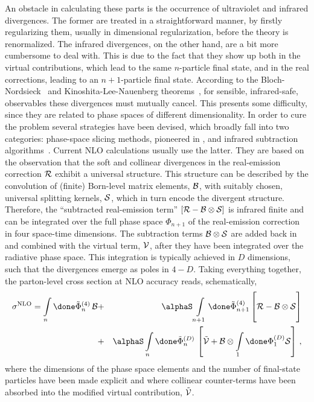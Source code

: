 An obstacle in calculating these parts is the occurrence of
ultraviolet and infrared divergences.  The former are treated in a
straightforward manner, by firstly regularizing them, usually in
dimensional regularization, before the theory is renormalized.  The
infrared divergences, on the other hand, are a bit more cumbersome to
deal with.  This is due to the fact that they show up both in the
virtual contributions, which lead to the same $n$-particle final
state, and in the real corrections, leading to an $n+1$-particle final
state.  According to the Bloch-Nordsieck~\cite{Bloch:1937pw} and
Kinoshita-Lee-Nauenberg theorems~\cite{Kinoshita:1962ur,Lee:1964is},
for sensible, \ie infrared-safe, observables these divergences must
mutually cancel.  This presents some difficulty, since they are
related to phase spaces of different dimensionality.  In order to cure
the problem several strategies have been devised, which broadly fall
into two categories: phase-space slicing methods, pioneered in
\cite{Giele:1991vf,Giele:1993dj}, and infrared subtraction
algorithms~\cite{Catani:1996vz,Catani:2002hc,
  Kosower:1997zr,Kosower:2003bh,GehrmannDeRidder:2005cm,Daleo:2006xa,
  Frixione:1995ms,Frixione:1997np}. Current NLO calculations usually
use the latter.  They are based on the observation that the soft and
collinear divergences in the real-emission correction $\cal R$ exhibit
a universal structure.  This structure can be described by the
convolution of (finite) Born-level matrix elements, ${\cal B}$, with
suitably chosen, universal splitting kernels, ${\cal S}$, which in
turn encode the divergent structure.  Therefore, the ``subtracted
real-emission term'' $[{\cal R}-{\cal B}\otimes{\cal S}]$ is infrared finite and can
be integrated over the full phase space $\Phi_{n+1}$ of the
real-emission correction in four space-time dimensions.  The
subtraction terms ${\cal B}\otimes{\cal S}$
are added back in and combined with the virtual
term, ${\cal V}$, after they have been integrated over the radiative
phase space.  This integration is typically achieved in $D$
dimensions, such that the divergences emerge as poles in $4-D$.
Taking everything together, the parton-level cross section at NLO
accuracy reads, schematically,
\begin{eqnarray}
\label{Eq::NLO_XSec_Subtracted}
\sigma^{\rm NLO} =
\int\limits_n\done\tilde\Phi_n^{(4)}\,{\cal B} &+&
\alphaS\int\limits_{n+1}\done\tilde\Phi_{n+1}^{(4)}
        \left[\vphantom{\int\limits_{n}}
        {\cal R}-{\cal B}\otimes{\cal S}\right]\nonumber\\
&+&\alphaS\int\limits_n\done\tilde\Phi_n^{(D)}\,
        \left[\tilde{\cal V}+
              {\cal B}\otimes
              \int\limits_1\done\Phi_1^{(D)}{\cal S}\right]\,,
\end{eqnarray}
where the dimensions of the phase space elements and the number of
final-state particles have been made explicit and where collinear counter-terms
have been absorbed into the modified virtual contribution, $\tilde{\cal V}$.

